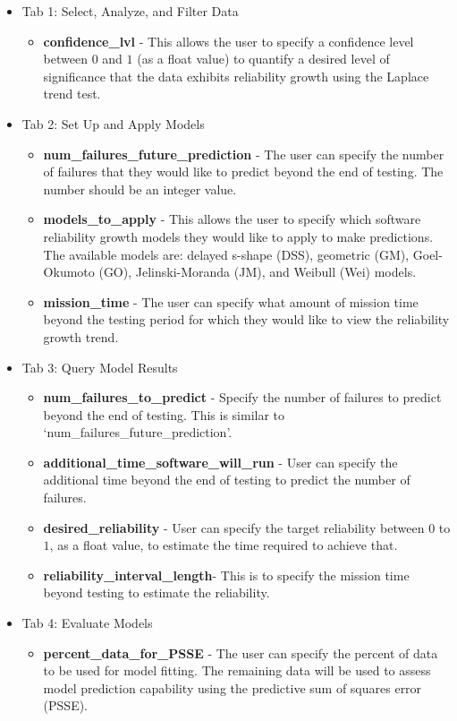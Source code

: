 \documentclass[conference]{IEEEtran}
\begin{document}
\begin{enumerate}
{\begin{itemize}
{\begin{itemize}
    \end{itemize}
  }
    \item {Tab 1: Select, Analyze, and Filter Data
    \begin{itemize}
    \item{\textbf{confidence\_lvl} - This allows the user to specify a confidence level between $0$ and $1$ (as a float value) to quantify a desired level of significance that the data exhibits reliability growth using the Laplace trend test.}
    \end{itemize}
    }
    \item {Tab 2: Set Up and Apply Models
    \begin{itemize}
      \item {\textbf{num\_failures\_future\_prediction} - The user can specify the number of failures that they would like to predict beyond the end of testing. The number should be an integer value.}
      \item {\textbf{models\_to\_apply} - This allows the user to specify which software reliability growth models they would like to apply to make predictions. The available models are: delayed s-shape (DSS), geometric (GM), Goel-Okumoto (GO), Jelinski-Moranda (JM), and Weibull (Wei) models. }
      \item {\textbf{mission\_time} - The user can specify what amount of mission time beyond the testing period for which they would like to view the reliability growth trend. }
    \end{itemize}
    }
    \item {Tab 3: Query Model Results
    \begin{itemize}
      \item {\textbf{num\_failures\_to\_predict} - Specify the number of failures to predict beyond the end of testing. This is similar to `num\_failures\_future\_prediction'.}
      \item {\textbf{additional\_time\_software\_will\_run} - User can specify the additional time beyond the end of testing to predict the number of failures. }
      \item {\textbf{desired\_reliability} - User can specify the target reliability between $0$ to $1$, as a float value, to estimate the time required to achieve that.}
      \item {\textbf{reliability\_interval\_length}- This is to specify the mission time beyond testing to estimate the reliability.}
    \end{itemize}
    }
    \item {Tab 4: Evaluate Models
    \begin{itemize}
    \item{\textbf{percent\_data\_for\_PSSE} - The user can specify the percent of data to be used for model fitting. The remaining data will be used to assess model prediction capability using the predictive sum of squares error (PSSE).}
    \end{itemize}
    }
  \end{itemize}
  }


\end{enumerate}
\end{document}
